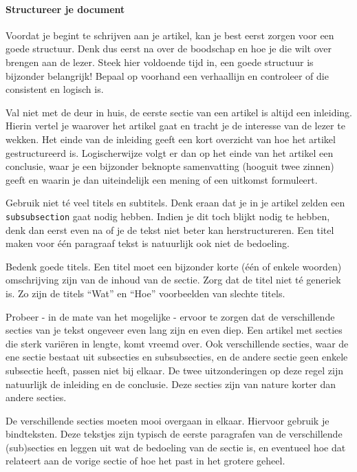 \documentclass[a4paper]{article}
\begin{document}
\paragraph{Structureer je document}

Voordat je begint te schrijven aan je artikel, kan je best eerst zorgen voor een goede structuur.
Denk dus eerst na over de boodschap en hoe je die wilt over brengen aan de lezer.
Steek hier voldoende tijd in, een goede structuur is bijzonder belangrijk!
Bepaal op voorhand een verhaallijn en controleer of die consistent en logisch is.

Val niet met de deur in huis, de eerste sectie van een artikel is altijd een inleiding.
Hierin vertel je waarover het artikel gaat en tracht je de interesse van de lezer te wekken.
Het einde van de inleiding geeft een kort overzicht van hoe het artikel gestructureerd is.
Logischerwijze volgt er dan op het einde van het artikel een conclusie, waar je een bijzonder beknopte samenvatting (hooguit twee zinnen) geeft en waarin je dan uiteindelijk een mening of een uitkomst formuleert.

Gebruik niet t\'e veel titels en subtitels.
Denk eraan dat je in je artikel zelden een \texttt{\\subsubsection} gaat nodig hebben.
Indien je dit toch blijkt nodig te hebben, denk dan eerst even na of je de tekst niet beter kan herstructureren.
Een titel maken voor \'e\'en paragraaf tekst is natuurlijk ook niet de bedoeling.

Bedenk goede titels.
Een titel moet een bijzonder korte (\'e\'en of enkele woorden) omschrijving zijn van de inhoud van de sectie.
Zorg dat de titel niet t\'e generiek is.
Zo zijn de titels ``Wat'' en ``Hoe'' voorbeelden van slechte titels.

Probeer - in de mate van het mogelijke - ervoor te zorgen dat de verschillende secties van je tekst ongeveer even lang zijn en even diep.
Een artikel met secties die sterk vari\"eren in lengte, komt vreemd over.
Ook verschillende secties, waar de ene sectie bestaat uit subsecties en subsubsecties, en de andere sectie geen enkele subsectie heeft, passen niet bij elkaar.
De twee uitzonderingen op deze regel zijn natuurlijk de inleiding en de conclusie.
Deze secties zijn van nature korter dan andere secties.

De verschillende secties moeten mooi overgaan in elkaar.
Hiervoor gebruik je bindteksten.
Deze tekstjes zijn typisch de eerste paragrafen van de verschillende (sub)secties en leggen uit wat de bedoeling van de sectie is, en eventueel hoe dat relateert aan de vorige sectie of hoe het past in het grotere geheel.
\end{document}
